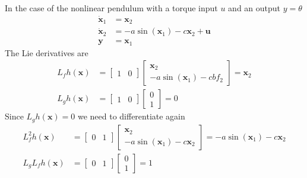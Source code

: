 \begin{examplesection}[Pendulum]
    In the case of the nonlinear pendulum with a torque input $u$ and an output $y=\theta$
    \begin{align*}
        \dot{\mathbf{x}}_1 & = \mathbf{x}_2                    \\
        \dot{\mathbf{x}}_2 & = -a \sin(\mathbf{x}_1)-c \mathbf{x}_2 + \mathbf{u} \\
        \mathbf{y}         & = \mathbf{x}_1
    \end{align*}
    The Lie derivatives are
    \begin{align*}
        L_f h(\mathbf{x}) & = \begin{bmatrix}
                         1 & 0
                     \end{bmatrix}
        \begin{bmatrix}
            \mathbf{x}_2 \\
            -a \sin(\mathbf{x}_1) -cbf  _2
        \end{bmatrix} = \mathbf{x}_2
        \\
        L_g h(\mathbf{x}) & = \begin{bmatrix}
                         1 & 0
                     \end{bmatrix}
        \begin{bmatrix}
            0 \\
            1
        \end{bmatrix} = 0
    \end{align*}
    Since $L_g h(\mathbf{x}) = 0$ we need to differentiate again
    \begin{align*}
        L_f^2 h(\mathbf{x})   & = \begin{bmatrix}
                             0 & 1
                         \end{bmatrix}
        \begin{bmatrix}
            \mathbf{x}_2 \\
            -a \sin(\mathbf{x}_1) -c\mathbf{x}_2
        \end{bmatrix} = -a \sin(\mathbf{x}_1) -c \mathbf{x}_2
        \\
        L_g L_f h(\mathbf{x}) & = \begin{bmatrix}
                             0 & 1
                         \end{bmatrix}
        \begin{bmatrix}
            0 \\
            1
        \end{bmatrix} = 1

\end{align*}
\end{examplesection}
